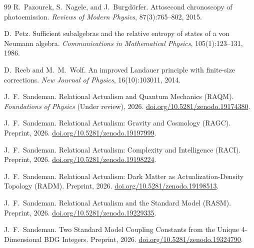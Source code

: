\documentclass[11pt,a4paper]{article}
\theoremstyle{plain}
\theoremstyle{definition}
\theoremstyle{remark}
\begin{document}
\begin{thebibliography}{99}
R.~Pazourek, S.~Nagele, and J.~Burgd\"{o}rfer.
\newblock Attosecond chronoscopy of photoemission.
\newblock \textit{Reviews of Modern Physics}, 87(3):765--802, 2015.

D.~Petz.
\newblock Sufficient subalgebras and the relative entropy of states of a von
  {Neumann} algebra.
\newblock \textit{Communications in Mathematical Physics}, 105(1):123--131,
  1986.


D.~Reeb and M.~M.~Wolf.
\newblock An improved {Landauer} principle with finite-size corrections.
\newblock \textit{New Journal of Physics}, 16(10):103011, 2014.

J.~F.~Sandeman.
\newblock Relational Actualism and Quantum Mechanics ({RAQM}).
\newblock \textit{Foundations of Physics} (Under review), 2026.
\newblock \href{https://doi.org/10.5281/zenodo.19174380}{doi.org/10.5281/zenodo.19174380}.

J.~F.~Sandeman.
\newblock Relational Actualism: Gravity and Cosmology ({RAGC}).
\newblock Preprint, 2026.
\newblock \href{https://doi.org/10.5281/zenodo.19197999}{doi.org/10.5281/zenodo.19197999}.

J.~F.~Sandeman.
\newblock Relational Actualism: Complexity and Intelligence ({RACI}).
\newblock Preprint, 2026.
\newblock \href{https://doi.org/10.5281/zenodo.19198224}{doi.org/10.5281/zenodo.19198224}.


J.~F.~Sandeman.
\newblock Relational Actualism: Dark Matter as Actualization-Density Topology ({RADM}).
\newblock Preprint, 2026.
\newblock \href{https://doi.org/10.5281/zenodo.19198513}{doi.org/10.5281/zenodo.19198513}.

J.~F.~Sandeman.
\newblock Relational Actualism and the Standard Model ({RASM}).
\newblock Preprint, 2026.
\newblock \href{https://doi.org/10.5281/zenodo.19229335}{doi.org/10.5281/zenodo.19229335}.

J.~F.~Sandeman.
\newblock Two Standard Model Coupling Constants from the Unique 4-Dimensional
  BDG Integers.
\newblock Preprint, 2026.
\newblock \href{https://doi.org/10.5281/zenodo.19324790}{doi.org/10.5281/zenodo.19324790}.

\end{thebibliography}
\end{document}
